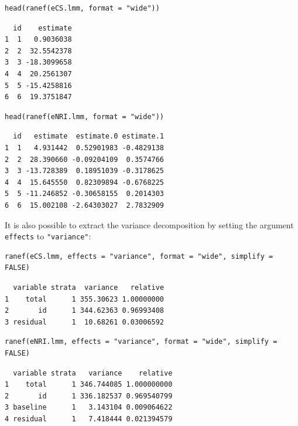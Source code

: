 \documentclass[12pt]{article}
\begin{document}
\bigskip

\begin{minipage}{0.48\linewidth}
\lstset{language=r,label= ,caption= ,captionpos=b,numbers=none}
\begin{lstlisting}
head(ranef(eCS.lmm, format = "wide"))
\end{lstlisting}

\begin{verbatim}
  id    estimate
1  1   0.9036038
2  2  32.5542378
3  3 -18.3099658
4  4  20.2561307
5  5 -15.4258816
6  6  19.3751847
\end{verbatim}

\end{minipage}
\begin{minipage}{0.48\linewidth}
\lstset{language=r,label= ,caption= ,captionpos=b,numbers=none}
\begin{lstlisting}
head(ranef(eNRI.lmm, format = "wide"))
\end{lstlisting}

\begin{verbatim}
  id   estimate  estimate.0 estimate.1
1  1   4.931442  0.52901983 -0.4829138
2  2  28.390660 -0.09204109  0.3574766
3  3 -13.728389  0.18951039 -0.3178625
4  4  15.645550  0.82309894 -0.6768225
5  5 -11.246852 -0.30658155  0.2014303
6  6  15.002108 -2.64303027  2.7832909
\end{verbatim}

\end{minipage}


It is also possible to extract the variance decomposition by setting
the argument \texttt{effects} to \texttt{"variance"}: 
\lstset{language=r,label= ,caption= ,captionpos=b,numbers=none}
\begin{lstlisting}
ranef(eCS.lmm, effects = "variance", format = "wide", simplify = FALSE)
\end{lstlisting}

\begin{verbatim}
  variable strata  variance   relative
1    total      1 355.30623 1.00000000
2       id      1 344.62363 0.96993408
3 residual      1  10.68261 0.03006592
\end{verbatim}


\lstset{language=r,label= ,caption= ,captionpos=b,numbers=none}
\begin{lstlisting}
ranef(eNRI.lmm, effects = "variance", format = "wide", simplify = FALSE)
\end{lstlisting}

\begin{verbatim}
  variable strata   variance    relative
1    total      1 346.744085 1.000000000
2       id      1 336.182537 0.969540799
3 baseline      1   3.143104 0.009064622
4 residual      1   7.418444 0.021394579
\end{verbatim}
\end{document}
